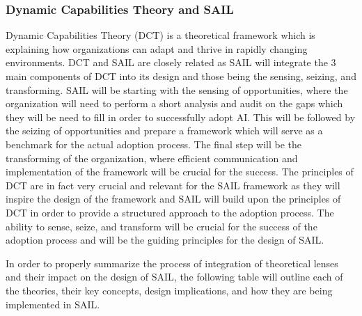 \documentclass[]{imc-inf}
\begin{document}
\subsubsection{Dynamic Capabilities Theory and
	SAIL}\label{dynamic-capabilities-theory-and-sail}

Dynamic Capabilities Theory (DCT) is a theoretical framework which is
explaining how organizations can adapt and thrive in rapidly changing
environments. DCT and SAIL are closely related as SAIL will integrate
the 3 main components of DCT into its design and those being the
sensing, seizing, and transforming. SAIL will be starting with the
sensing of opportunities, where the organization will need to perform a
short analysis and audit on the gaps which they will be need to fill in
order to successfully adopt AI. This will be followed by the seizing of
opportunities and prepare a framework which will serve as a benchmark
for the actual adoption process. The final step will be the transforming
of the organization, where efficient communication and implementation of
the framework will be crucial for the success. The principles of DCT are
in fact very crucial and relevant for the SAIL framework as they will
inspire the design of the framework and SAIL will build upon the
principles of DCT in order to provide a structured approach to the
adoption process. The ability to sense, seize, and transform will be
crucial for the success of the adoption process and will be the guiding
principles for the design of SAIL.




In order to properly summarize the process of integration of theoretical lenses and their impact on the design of SAIL, the following table will outline each of the theories, their key concepts, design implications, and how they are being implemented in SAIL.
\end{document}
